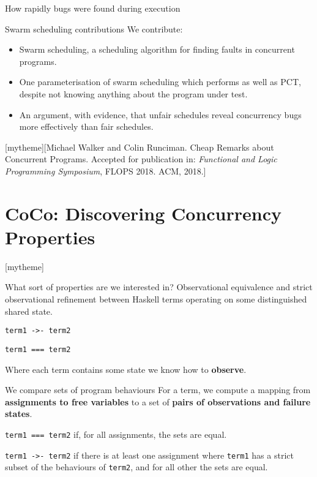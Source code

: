 \documentclass{beamer}
\newcommand{\sectiontext}[2]{
   \setbeamertemplate{section page}[mytheme][#2]
   \section{#1}
   \setbeamertemplate{section page}[mytheme]
}
\begin{document}
\begin{frame}{How rapidly bugs were found during execution}
\begin{center}
  \resizebox{0.9\textwidth}{!}{}
\end{center}
\end{frame}

\begin{frame}{Swarm scheduling contributions}
  We contribute:

  \begin{itemize}
  \item Swarm scheduling, a scheduling algorithm for finding faults in
    concurrent programs.

  \item One parameterisation of swarm scheduling which performs as
    well as PCT, despite not knowing anything about the program under
    test.

  \item An argument, with evidence, that unfair schedules reveal
    concurrency bugs more effectively than fair schedules.
  \end{itemize}
\end{frame}

\sectiontext{CoCo: Discovering Concurrency Properties}{Michael Walker and Colin Runciman.  Cheap Remarks about Concurrent Programs.  Accepted for publication in: \emph{Functional and Logic Programming Symposium}, FLOPS 2018.  ACM, 2018.}

\begin{frame}{What sort of properties are we interested in?}
  Observational equivalence and strict observational refinement
  between Haskell terms operating on some distinguished shared state.

  \begin{center}
    \texttt{term1 ->- term2}

    \texttt{term1 === term2}
  \end{center}

  Where each term contains some state we know how to \textbf{observe}.
\end{frame}

\begin{frame}{We compare sets of program behaviours}
  For a term, we compute a mapping from \textbf{assignments to free
    variables} to a set of \textbf{pairs of observations and failure
    states}.

  \texttt{term1 === term2} if, for all assignments, the sets are
  equal.

  \texttt{term1 ->- term2} if there is at least one assignment where
  \texttt{term1} has a strict subset of the behaviours of
  \texttt{term2}, and for all other the sets are equal.
\end{frame}
\end{document}
